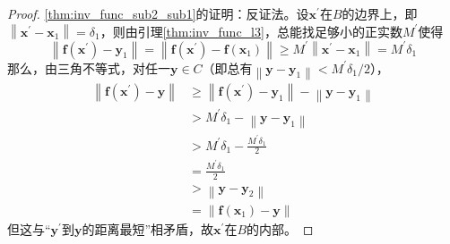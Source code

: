 \documentclass[../main.tex]{subfiles}
\begin{document}
\begin{proof}
    \ref{thm:inv_func_sub2_sub1}的证明：反证法。设$\mathbf{x}^\prime$在$B$的边界上，即$\left\|\mathbf{x}^\prime-\mathbf{x}_1\right\|=\delta_1$，则由引理\ref{thm:inv_func_l3}，总能找足够小的正实数$M^\prime$使得
    \[\left\|\mathbf{f}\left(\mathbf{x}^\prime\right)-\mathbf{y}_1\right\|=\left\|\mathbf{f}\left(\mathbf{x}^\prime\right)-\mathbf{f}\left(\mathbf{x}_1\right)\right\|\geq M^\prime\left\|\mathbf{x}^\prime-\mathbf{x}_1\right\|=M^\prime\delta_1
    \]
    那么，由三角不等式，对任一$\mathbf{y}\in C$（即总有$\left\|\mathbf{y}-\mathbf{y}_1\right\|<M^\prime\delta_1/2$），
    \begin{align*}
        \left\|\mathbf{f}\left(\mathbf{x}^\prime\right)-\mathbf{y}\right\| & \geq\left\|\mathbf{f}\left(\mathbf{x}^\prime\right)-\mathbf{y}_1\right\|-\left\|\mathbf{y}-\mathbf{y}_1\right\| \\
                                                                           & >M^\prime\delta_1-\left\|\mathbf{y}-\mathbf{y}_1\right\|                                                        \\
                                                                           & >M^\prime\delta_1-\frac{M^\prime\delta_1}{2}                                                                    \\
                                                                           & =\frac{M^\prime\delta_1}{2}                                                                                     \\
                                                                           & >\left\|\mathbf{y}-\mathbf{y}_2\right\|                                                                         \\
                                                                           & =\left\|\mathbf{f}\left(\mathbf{x}_1\right)-\mathbf{y}\right\|
    \end{align*}
    但这与“$\mathbf{y}^\prime$到$\mathbf{y}$的距离最短”相矛盾，故$\mathbf{x}^\prime$在$B$的内部。


\end{proof}
\end{document}
